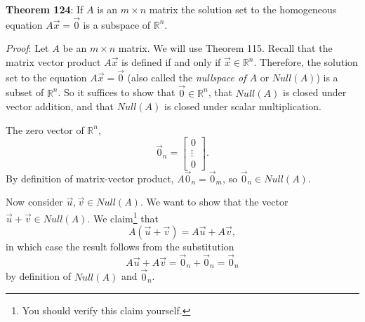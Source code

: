 \documentclass{exam}
\begin{document}

\textbf{Theorem 124}: If $A$ is an $m\times n$ matrix the solution set to the homogeneous equation $A\Vec{x}=\Vec{0}$ is a subspace of $\mathbb{R}^n$. \newline
\vspace{0.2in}
\newline

\textit{Proof}: Let $A$ be an $m\times n$ matrix. We will use Theorem 115. Recall that the matrix vector product $A\Vec{x}$ is defined if and only if $\Vec{x}\in\mathbb{R}^n$. Therefore, the solution set to the equation $A\Vec{x}=\Vec{0}$ (also called the \textit{nullspace of $A$} or $Null(A)$) is a subset of $\mathbb{R}^n$. So it suffices to show that $\Vec{0}\in\mathbb{R}^n$, that $Null(A)$ is closed under vector addition, and that $Null(A)$ is closed under scalar multiplication. 

The zero vector of $\mathbb{R}^n,$ $$\Vec{0}_n=\left[\begin{array}{c} 0 \\ \vdots \\ 0\end{array}\right].$$ By definition of matrix-vector product, $A\Vec{0}_n=\Vec{0}_m$, so $\Vec{0}_n\in Null(A)$. 

Now consider $\Vec{u},\Vec{v}\in Null(A)$. We want to show that the vector $\Vec{u}+\Vec{v}\in Null(A)$. We claim\footnote{You should verify this claim yourself.} that $$A(\Vec{u}+\Vec{v})=A\Vec{u}+A\Vec{v},$$ in which case the result follows from the substitution $$A\Vec{u}+A\Vec{v}=\Vec{0}_n+\Vec{0}_n=\Vec{0}_n$$ by definition of $Null(A)$ and $\Vec{0}_n$.
\end{document}
